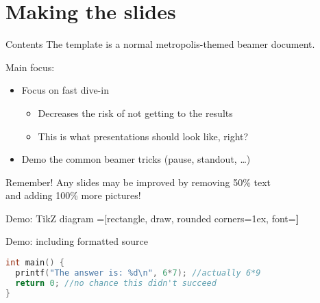\documentclass[aspectratio=169]{beamer}
\begin{document}
\section{Making the slides}

\begin{frame}{Contents}
The template is a normal metropolis-themed beamer document.

Main focus:
\begin{itemize}
\item Focus on fast dive-in \pause
  \begin{itemize}
  \item Decreases the risk of not getting to the results
  \item This is what presentations should look like, right? \pause
  \end{itemize}
\item Demo the common beamer tricks (pause, standout, \dots)
\end{itemize}
\end{frame}

\begin{frame}[standout]{Remember!}
Any slides may be improved by removing 50\% text \\ and adding 100\% more pictures!
\end{frame}

\begin{frame}{Demo: TikZ diagram}
\centering
{}=[rectangle, draw, rounded corners=1ex, font=\huge\bfseries]
\end{frame}

\begin{frame}[fragile]{Demo: including formatted source}

\begin{lstlisting}[language=C,showstringspaces=false,basicstyle=\tt\small,commentstyle=\color{green!50!black},keywordstyle=\bfseries\color{blue!50!black},stringstyle=\color{red!50!black}]
int main() {
  printf("The answer is: %d\n", 6*7); //actually 6*9
  return 0; //no chance this didn't succeed
}
\end{lstlisting}
\end{frame}
\end{document}

